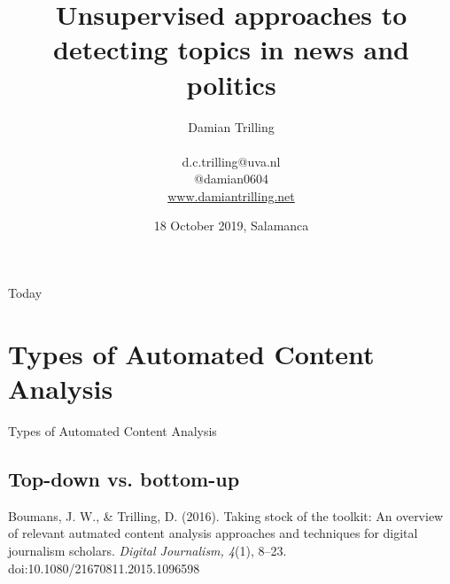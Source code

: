 \documentclass{beamer}
\begin{document}
\title{Unsupervised approaches to detecting topics in news and politics}
\author[Damian Trilling]{Damian Trilling \\ ~ \\ \footnotesize{d.c.trilling@uva.nl \\@damian0604} \\ \url{www.damiantrilling.net}}
\date[18 October 2019]{18 October 2019, Salamanca}


\begin{frame}{}
\titlepage
\end{frame}

\begin{frame}{Today}
\tableofcontents
\end{frame}




\section{Types of Automated Content Analysis}
\begin{frame}{}
Types of Automated Content Analysis
\end{frame}
\subsection*{Top-down vs. bottom-up}


\begin{frame}[plain]

\tiny{Boumans, J. W., \& Trilling, D. (2016). Taking stock of the toolkit: An overview of relevant autmated content analysis approaches and techniques for digital journalism scholars. \textit{Digital Journalism, 4}(1), 8–23. doi:10.1080/21670811.2015.1096598}
\end{frame}
\end{document}
